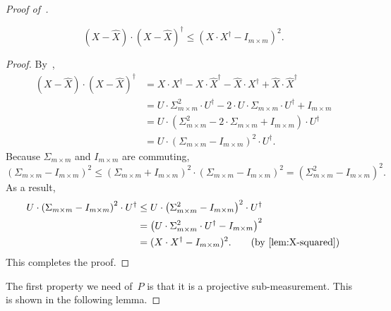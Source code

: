 \begin{proof}[Proof of~]
\begin{lemma}\label{lem:squared-difference}
\begin{equation*}
(X - \widehat{X}) \cdot (X - \widehat{X})^\dagger \leq (X \cdot X^\dagger - I_{m \times m})^2.
\end{equation*}
\end{lemma}
\begin{proof}
By~,
\begin{align*}
(X - \widehat{X}) \cdot (X - \widehat{X})^\dagger
& = X \cdot X^\dagger  - X\cdot \widehat{X}^\dagger - \widehat{X} \cdot X^\dagger + \widehat{X} \cdot \widehat{X}^\dagger\\
& = U \cdot \Sigma_{m \times m}^2 \cdot U^\dagger  - 2 \cdot U \cdot \Sigma_{m \times m} \cdot U^\dagger+ I_{m \times m}\\
& = U \cdot \left(\Sigma_{m \times m}^2   - 2 \cdot  \Sigma_{m \times m} +  I_{m \times m} \right) \cdot U^\dagger\\
& = U \cdot \left(\Sigma_{m \times m}  -  I_{m \times m}\right)^2 \cdot U^\dagger.
\end{align*}
Because $\Sigma_{m \times m}$ and $I_{m \times m}$ are commuting,
\begin{equation*}
(\Sigma_{m \times m} - I_{m \times m})^2
\leq (\Sigma_{m \times m} + I_{m \times m})^2 \cdot (\Sigma_{m \times m} - I_{m \times m})^2
= (\Sigma_{m\times m}^2 - I_{m \times m})^2.
\end{equation*}
As a result,
\begin{align*}
U \cdot \left(\Sigma_{m \times m}  -  I_{m \times m}\right)^2 \cdot U^\dagger
& \leq U \cdot \left(\Sigma_{m \times m}^2 -  I_{m \times m}\right)^2 \cdot U^\dagger\\
& = \left(U \cdot \Sigma_{m \times m}^2 \cdot U^\dagger - I_{m \times m} \right)^2\\
&= (X \cdot X^\dagger - I_{m \times m})^2. \tag{by \Cref{lem:X-squared}}
\end{align*}
This completes the proof.
\end{proof}

The first property we need of~$P$ is that it is a projective sub-measurement.
This is shown in the following lemma.


\end{proof}
